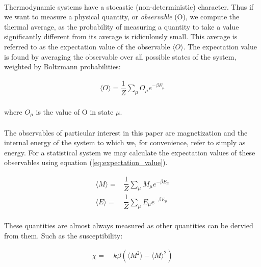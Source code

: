 \documentclass[12pt] {report} %
\begin{document}
			\paragraph{}
				Thermodynamic systems have a stocastic (non-deterministic) character. Thus if we want to measure a physical quantity, or \textit{observable} (O), we compute the thermal average, as the probability of measuring a quantity to take a value significantly different from its average is ridiculously small. This average is referred to as the expectation value of the observable $\langle O \rangle$. The expectation value is found by averaging the observable over all possible states of the system, weighted by Boltzmann probabilities: 
				
			\begin{align}
				\langle O \rangle = \dfrac{1}{Z} \sum_{\mu} O_\mu e^{- \beta E_\mu}	\label{eq:expectation_value}
			\end{align}
			
			\paragraph{}
				where $O_\mu$ is the value of O in state $ \mu $.
				
			\paragraph{}
				The observables of particular interest in this paper are magnetization and the internal energy of the system to which we, for convenience, refer to simply as energy. For a statistical system we may calculate the expectation values of these observables using equation (\ref{eq:expectation_value}).
				
			\begin{align}
				\langle M \rangle =& \dfrac{1}{Z} \sum_{\mu} M_\mu e^{- \beta E_\mu}  \label{eq:expectation_value_mag}\\
				\langle E \rangle =& \dfrac{1}{Z} \sum_{\mu} E_\mu e^{- \beta E_\mu}	\label{eq:expectation_value_energy}
			\end{align} 
			
			\paragraph{}
				These quantities are almost always measured as other quantities can be dervied from them. Such as the susceptibility:
				
			\begin{align}
				\chi =& \: k \beta (\langle M^2 \rangle - \langle M \rangle^2)	\label{eq:susceptibility}
			\end{align}
				
\end{document}
